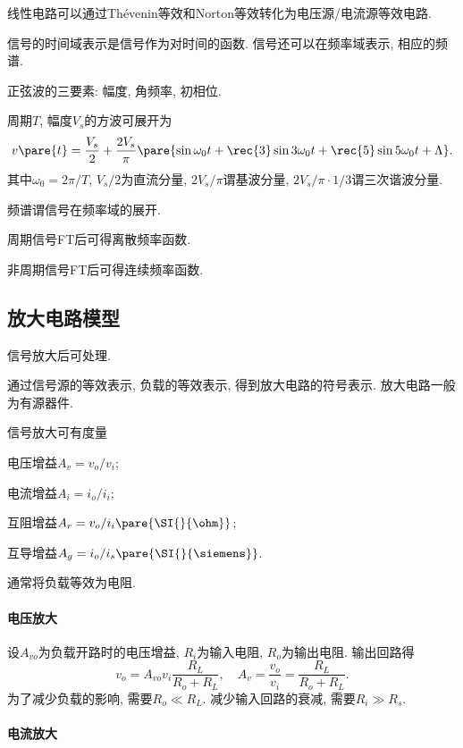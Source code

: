 \documentclass[hidelinks]{ctexart}
\begin{document}
线性电路可以通过Th\'evenin等效和Norton等效转化为电压源/电流源等效电路.
\par
信号的时间域表示是信号作为对时间的函数. 信号还可以在频率域表示, 相应的频谱.
\par
正弦波的三要素: 幅度, 角频率, 初相位.
\begin{ex}
    周期$T$, 幅度$V_s$的方波可展开为
    \[ v\pare{t} = \frac{V_s}{2} + \frac{2V_s}{\pi} \pare{\sin\omega_0 t + \rec{3}\sin 3\omega_0 t + \rec{5}\sin 5\omega_0 t + \Lambda}. \]
    其中$\omega_0 = 2\pi/T$, $V_s/2$为直流分量, $2V_s/\pi$谓基波分量, $2V_s/\pi \cdot 1/3$谓三次谐波分量.
\end{ex}
频谱谓信号在频率域的展开.
\par
周期信号FT后可得离散频率函数.
\par
非周期信号FT后可得连续频率函数.


\subsection{放大电路模型} %
\label{sub:放大电路模型}

信号放大后可处理.
\par
通过信号源的等效表示, 负载的等效表示, 得到放大电路的符号表示. 放大电路一般为有源器件.
\par
信号放大可有度量
\begin{cenum}
    \item 电压增益$A_v = v_o / v_i$;
    \item 电流增益$A_i = i_o / i_i$;
    \item 互阻增益$A_r = v_o / i_i\pare{\SI{}{\ohm}}$;
    \item 互导增益$A_g = i_o / i_s\pare{\SI{}{\siemens}}$.
\end{cenum}
通常将负载等效为电阻.
\paragraph{电压放大} %
\label{par:电压放大}

设$A_{vo}$为负载开路时的电压增益, $R_i$为输入电阻, $R_o$为输出电阻. 输出回路得
\[ v_o = A_{vo}v_i \frac{R_L}{R_o + R_L},\quad A_v = \frac{v_o}{v_i} = \frac{R_L}{R_o+R_L}. \]
为了减少负载的影响, 需要$R_o \ll R_L$. 减少输入回路的衰减, 需要$R_i \gg R_s$.


\paragraph{电流放大} %
\label{par:电流放大}
\end{document}
